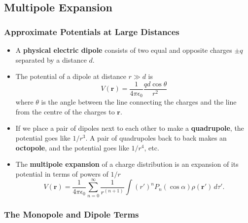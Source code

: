 \documentclass{article}
\renewcommand{\vec}[1]{\boldsymbol{\mathbf{#1}}}
\newcommand{\ke}{\frac{1}{4 \pi \epsilon_0}}
\begin{document}
\subsection{Multipole Expansion}

\subsubsection{Approximate Potentials at Large Distances}

\begin{itemize}
  \item A \textbf{physical electric dipole} consists of two equal and opposite charges $\pm q$ separated by a distance $d$.

  \item The potential of a dipole at distance $r \gg d$ is \[V(\vec{r}) = \ke \frac{q d \cos \theta}{r^2}\] where $\theta$ is the angle between the line connecting the charges and the line from the centre of the charges to $\vec{r}$.

  \item If we place a pair of dipoles next to each other to make a \textbf{quadrupole}, the potential goes like $1 / r^3$. A pair of quadrupoles back to back makes an \textbf{octopole}, and the potential goes like $1 / r^4$, etc.

  \item The \textbf{multipole expansion} of a charge distribution is an expansion of its potential in terms of powers of $1 / r$ \[V(\vec{r}) = \ke \sum_{n = 0}^\infty \frac{1}{r^{(n + 1)}} \int (r')^n P_n(\cos \alpha) \rho(\vec{r}') \,d \tau'.\]
\end{itemize}

\subsubsection{The Monopole and Dipole Terms}
\end{document}
